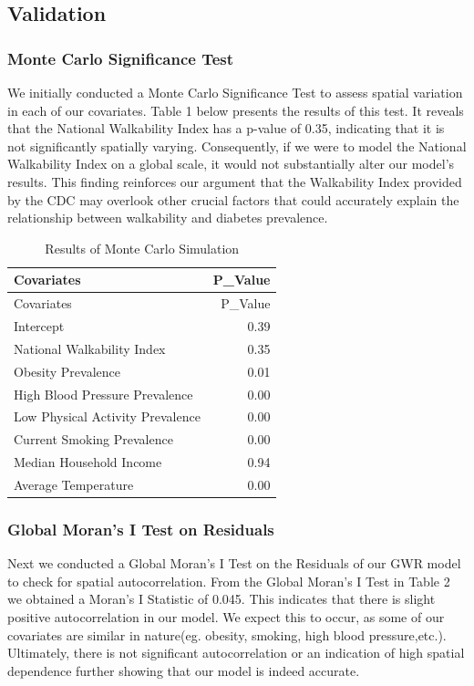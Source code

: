 \documentclass[
]{article}
\begin{document}
\subsection{Validation}\label{validation-1}

\subsubsection{Monte Carlo Significance
Test}\label{monte-carlo-significance-test}

We initially conducted a Monte Carlo Significance Test to assess spatial
variation in each of our covariates. Table 1 below presents the results
of this test. It reveals that the National Walkability Index has a
p-value of 0.35, indicating that it is not significantly spatially
varying. Consequently, if we were to model the National Walkability
Index on a global scale, it would not substantially alter our model's
results. This finding reinforces our argument that the Walkability Index
provided by the CDC may overlook other crucial factors that could
accurately explain the relationship between walkability and diabetes
prevalence.

\begin{longtable}[]{@{}lr@{}}
\caption{Results of Monte Carlo Simulation}\tabularnewline
\toprule\noalign{}
Covariates & P\_Value \\
\midrule\noalign{}
\endfirsthead
\toprule\noalign{}
Covariates & P\_Value \\
\midrule\noalign{}
\endhead
\bottomrule\noalign{}
\endlastfoot
Intercept & 0.39 \\
National Walkability Index & 0.35 \\
Obesity Prevalence & 0.01 \\
High Blood Pressure Prevalence & 0.00 \\
Low Physical Activity Prevalence & 0.00 \\
Current Smoking Prevalence & 0.00 \\
Median Household Income & 0.94 \\
Average Temperature & 0.00 \\
\end{longtable}

\subsubsection{Global Moran's I Test on
Residuals}\label{global-morans-i-test-on-residuals}

Next we conducted a Global Moran's I Test on the Residuals of our GWR
model to check for spatial autocorrelation. From the Global Moran's I
Test in Table 2 we obtained a Moran's I Statistic of 0.045. This
indicates that there is slight positive autocorrelation in our model. We
expect this to occur, as some of our covariates are similar in
nature(eg. obesity, smoking, high blood pressure,etc.). Ultimately,
there is not significant autocorrelation or an indication of high
spatial dependence further showing that our model is indeed accurate.
\end{document}
